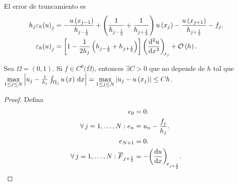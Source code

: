 \begin{frame}
	El error de truncamiento es
	\begin{align*}
		h_{j}
		\varepsilon_{h}
		{\left(u\right)}_{j} & =
		-\frac{u\left(x_{j-1}\right)}{h_{j-\frac{1}{2}}}+
		\left(
		\frac{1}{h_{j-\frac{1}{2}}}+\frac{1}{h_{j+\frac{1}{2}}}
		\right)
		u\left(x_{j}\right)-
		\frac{u\left(x_{j+1}\right)}{h_{j+\frac{1}{2}}}-
		f_{j}.                   \\
		\varepsilon_{h}
		{\left(u\right)}_{j} & =
		\left[
			1-
			\frac{1}{2h_{j}}
			\left(
			h_{j-\frac{1}{2}}+
			h_{j+\frac{1}{2}}
			\right)
			\right]
		\diff[2]{u}{x}[x_{j}]+
		\mathcal{O}\left(h\right).
	\end{align*}

	\begin{theorem}
		Sea $\Omega=\left(0,1\right)$.
		Si $f\in C^{0}\big(\overline{\Omega}\big)$, entonces
		$\exists C>0$ que no depende de $h$ tal que
		\begin{math}
			\max\limits_{1\leq j\leq N}
			\left|
			u_{j}-
			\frac{1}{h_{j}}
			\int_{\Omega_{j}}
			u\left(x\right)\dl x
			\right|=
			\max\limits_{1\leq j\leq N}
			\left|
			u_{j}-
			u\left(x_{j}\right)
			\right|\leq
			Ch
		\end{math}.
	\end{theorem}

	\begin{proof}
		Defina
		\begin{align*}
			e_{0}                        & =0. \\
			\forall j=1,\dotsc,N:
			e_{n}                        & =
			u_{n}-\frac{f_{j}}{h_{j}}.         \\
			e_{N+1}                      & =0. \\
			\forall j=1,\dotsc,N:
			\overline{F}_{j+\frac{1}{2}} & =
			-\diff{u}{x}[x_{j+\frac{1}{2}}].
		\end{align*}
	\end{proof}
\end{frame}

